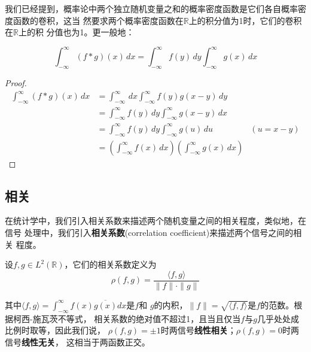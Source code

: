 \documentclass{ctexbook}
\begin{document}
我们已经提到，概率论中两个独立随机变量之和的概率密度函数是它们各自概率密度函数的卷积，这当
然要求两个概率密度函数在$\mathbb{R}$上的积分值为1时，它们的卷积在$\mathbb{R}$上的积
分值也为1。更一般地：
\begin{proposition}[卷积的“面积”关系]
\[\int_{-\infty}^{\infty}(f*g)(x)\,dx=\int_{-\infty}^{\infty}f(y)\,dy\int_{-\infty}^{\infty}g(x)\,dx\]
\end{proposition}
\begin{proof}
\begin{align*}
    \int_{-\infty}^{\infty}(f*g)(x)\,dx & =\int_{-\infty}^{\infty}\,dx\int_{-\infty}^{\infty}f(y)g(x-y)\,dy                                   \\
                                        & =\int_{-\infty}^{\infty}f(y)\,dy\int_{-\infty}^{\infty}g(x-y)\,dx                                   \\
                                        & =\int_{-\infty}^{\infty}f(y)\,dy\int_{-\infty}^{\infty}g(u)\,du                           & (u=x-y) \\
                                        & =\left(\int_{-\infty}^{\infty}f(x)\,dx\right)\left(\int_{-\infty}^{\infty}g(x)\,dx\right)
\end{align*}
\end{proof}

\subsection{相关}\label{sub:correlation}
在统计学中，我们引入相关系数来描述两个随机变量之间的相关程度，类似地，在信号
处理中，我们引入\textbf{相关系数}(correlation coefficient)来描述两个信号之间的相关
程度。
\begin{definition}[相关系数]
设$f,g\in L^2(\mathbb{R})$，它们的相关系数定义为
\begin{equation*}
    \rho(f,g)=\frac{\langle f,g\rangle}{\|f\|\cdot\|g\|}
\end{equation*}
\end{definition}
其中$\langle f,g\rangle=\int_{-\infty}^{\infty}f(x)\overline{g(x)}dx$是$f$和
$g$的内积，$\|f\|=\sqrt{\langle f,f\rangle}$是$f$的范数。根据柯西-施瓦茨不等式，
相关系数的绝对值不超过1，且当且仅当$f$与$g$几乎处处成比例时取等，因此我们说，
$\rho(f,g)=\pm 1$时两信号\textbf{线性相关}；$\rho(f,g)=0$时两信号\textbf{线性无关}，
这相当于两函数正交。
\end{document}
